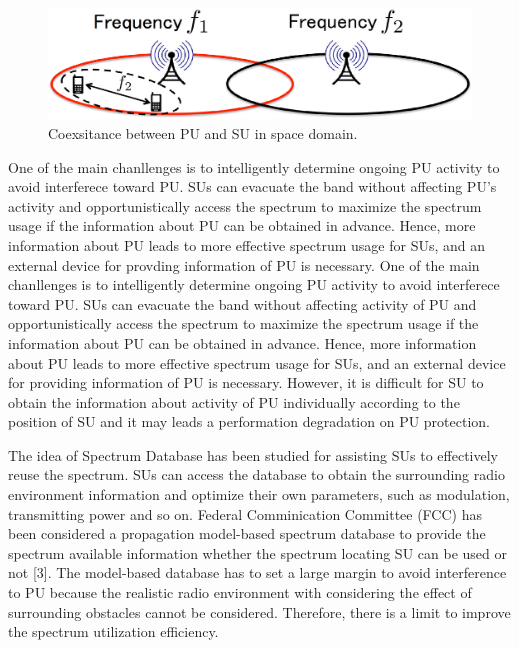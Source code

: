 \begin{figure}[!htp]
\includegraphics[width=150mm,clip]{CR_space.eps}
\caption{Coexsitance between PU and SU in space domain.}
\label{fig:CR_space}
\end{figure}

One of the main chanllenges is to intelligently determine ongoing PU activity to avoid interferece toward PU. SUs can evacuate the band without affecting PU’s activity and opportunistically access the spectrum to maximize the spectrum usage if the information about PU can be obtained in advance. Hence, more information about PU leads to more effective spectrum usage for SUs, and an external device for provding information of PU is necessary. One of the main chanllenges is to intelligently determine ongoing PU activity to avoid interferece toward PU. SUs can evacuate the band without affecting activity of PU and opportunistically access the spectrum to maximize the spectrum usage if the information about PU can be obtained in advance. Hence, more information about PU leads to more effective spectrum usage for SUs, and an external device for providing information of PU is necessary. However, it is difficult for SU to obtain the information about activity of PU individually according to the position of SU and it may leads a performation degradation on PU protection.

The idea of Spectrum Database has been studied for assisting SUs to effectively reuse the spectrum. SUs can access the database to obtain the surrounding radio environment information and optimize their own parameters,
such as modulation, transmitting power and so on. Federal Comminication Committee (FCC) has been considered a propagation model-based spectrum database to provide the spectrum available information whether the spectrum locating SU can be used or not [3]. The model-based database has to set a large margin to avoid interference to PU because the realistic radio environment with considering the effect of surrounding obstacles cannot be considered. Therefore, there is a limit to improve the spectrum utilization efficiency.

